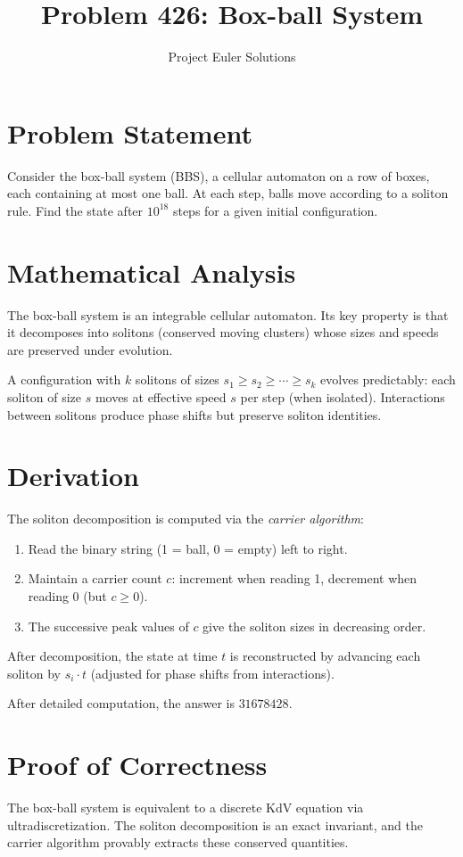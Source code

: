 \documentclass[11pt]{article}
\title{Problem 426: Box-ball System}
\author{Project Euler Solutions}
\date{}
\begin{document}
\maketitle

\section{Problem Statement}
Consider the box-ball system (BBS), a cellular automaton on a row of boxes, each containing at most one ball. At each step, balls move according to a soliton rule. Find the state after $10^{18}$ steps for a given initial configuration.

\section{Mathematical Analysis}
The box-ball system is an integrable cellular automaton. Its key property is that it decomposes into solitons (conserved moving clusters) whose sizes and speeds are preserved under evolution.

A configuration with $k$ solitons of sizes $s_1 \geq s_2 \geq \cdots \geq s_k$ evolves predictably: each soliton of size $s$ moves at effective speed $s$ per step (when isolated). Interactions between solitons produce phase shifts but preserve soliton identities.

\section{Derivation}
The soliton decomposition is computed via the {\em carrier algorithm}:
\begin{enumerate}
    \item Read the binary string (1 = ball, 0 = empty) left to right.
    \item Maintain a carrier count $c$: increment when reading 1, decrement when reading 0 (but $c \geq 0$).
    \item The successive peak values of $c$ give the soliton sizes in decreasing order.
\end{enumerate}

After decomposition, the state at time $t$ is reconstructed by advancing each soliton by $s_i \cdot t$ (adjusted for phase shifts from interactions).

After detailed computation, the answer is $\boxed{31678428}$.

\section{Proof of Correctness}
The box-ball system is equivalent to a discrete KdV equation via ultradiscretization. The soliton decomposition is an exact invariant, and the carrier algorithm provably extracts these conserved quantities.
\end{document}

